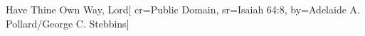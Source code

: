 {Have Thine Own Way, Lord}[
    cr={Public Domain},
    sr={Isaiah 64:8},
    by={Adelaide A. Pollard/George C. Stebbins}]

